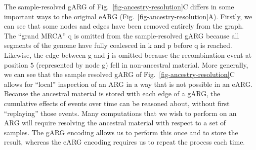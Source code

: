 \documentclass{article}
\newcommand{\noderef}[1]{\textsf{#1}}
\begin{document}
The sample-resolved gARG of Fig.~\ref{fig-ancestry-resolution}C
differs in some important ways to the
original eARG (Fig.~\ref{fig-ancestry-resolution}A).
Firstly, we can see that some nodes and edges have been removed entirely
from the graph.
The ``grand MRCA'' \noderef{q} is omitted from the
sample-resolved gARG because all segments of the genome have
fully coalesced in \noderef{k} and \noderef{p} before \noderef{q} is reached.
Likewise, the edge
between \noderef{g} and \noderef{j} is omitted because the recombination
event at position $5$ (represented by node \noderef{g})
fell in non-ancestral material.
More generally, we can see that the sample resolved
gARG of Fig.~\ref{fig-ancestry-resolution}C
allows for ``local'' inspection
of an ARG in a way that is not possible in an eARG.
Because the ancestral material is stored with each edge of a gARG, the
cumulative effects of events over time can be reasoned
about, without first ``replaying'' those events.
Many computations
that we wish to perform on an ARG will require resolving
the ancestral material with respect to a set of samples.
The gARG encoding
allows us to perform this once
and to store the result,
whereas the eARG encoding requires us to repeat the process
each time.

\end{document}
